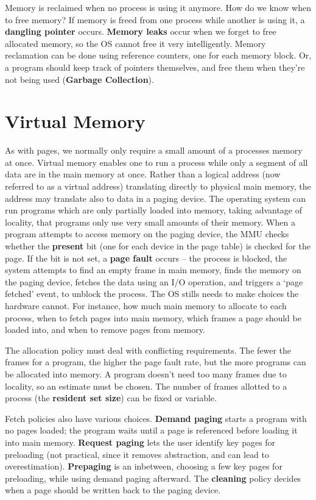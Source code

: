 Memory is reclaimed when no process is using it anymore. How do we know when to free memory? If memory is freed from one process while another is using it, a {\bf dangling pointer} occurs. {\bf Memory leaks} occur when we forget to free allocated memory, so the OS cannot free it very intelligently. Memory reclamation can be done using reference counters, one for each memory block. Or, a program should keep track of pointers themselves, and free them when they're not being used ({\bf Garbage Collection}).

\section{Virtual Memory}

As with pages, we normally only require a small amount of a processes memory at once. Virtual memory enables one to run a process while only a segment of all data are in the main memory at once. Rather than a logical address (now referred to as a virtual address) translating directly to physical main memory, the address may translate also to data in a paging device. The operating system can run programs which are only partially loaded into memory, taking advantage of locality, that programs only use very small amounts of their memory. When a program attempts to access memory on the paging device, the MMU checks whether the {\bf present} bit (one for each device in the page table) is checked for the page. If the bit is not set, a {\bf page fault} occurs -- the process is blocked, the system attempts to find an empty frame in main memory, finds the memory on the paging device, fetches the data using an I/O operation, and triggers a `page fetched' event, to unblock the process. The OS stills needs to make choices the hardware cannot. For instance, how much main memory to allocate to each process, when to fetch pages into main memory, which frames a page should be loaded into, and when to remove pages from memory.

The allocation policy must deal with conflicting requirements. The fewer the frames for a program, the higher the page fault rate, but the more programs can be allocated into memory. A program doesn't need too many frames due to locality, so an estimate must be chosen. The number of frames allotted to a process (the {\bf resident set size}) can be fixed or variable.

Fetch policies also have various choices. {\bf Demand paging} starts a program with no pages loaded; the program waits until a page is referenced before loading it into main memory. {\bf Request paging} lets the user identify key pages for preloading (not practical, since it removes abstraction, and can lead to overestimation). {\bf Prepaging} is an inbetween, choosing a few key pages for preloading, while using demand paging afterward. The {\bf cleaning} policy decides when a page should be written back to the paging device.

